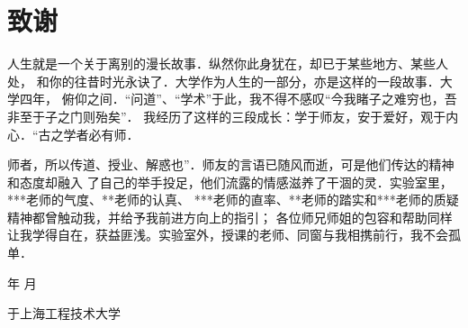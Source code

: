 
\chapter{致\qquad 谢}

{\songti\xiaosi
人生就是一个关于离别的漫长故事．纵然你此身犹在，却已于某些地方、某些人处，
和你的往昔时光永诀了．大学作为人生的一部分，亦是这样的一段故事．大学四年，
俯仰之间．“问道”、“学术”于此，我不得不感叹“今我睹子之难穷也，吾非至于子之门则殆矣”．
我经历了这样的三段成长：学于师友，安于爱好，观于内心．“古之学者必有师．

师者，所以传道、授业、解惑也”．师友的言语已随风而逝，可是他们传达的精神和态度却融入
了自己的举手投足，他们流露的情感滋养了干涸的灵．实验室里，***老师的气度、**老师的认真、
***老师的直率、**老师的踏实和***老师的质疑精神都曾触动我，并给予我前进方向上的指引；
各位师兄师姐的包容和帮助同样让我学得自在，获益匪浅。实验室外，授课的老师、同窗与我相携前行，我不会孤单．

\vspace{8cm}
\begin{flushright}
    年 \qquad 月

    于上海工程技术大学
\end{flushright}
}

